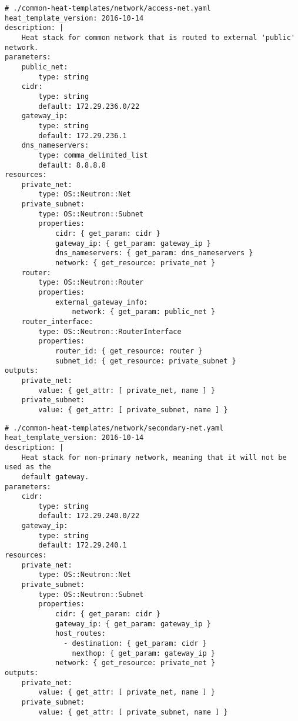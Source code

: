 \begin{verbatim}
# ./common-heat-templates/network/access-net.yaml
heat_template_version: 2016-10-14
description: |
    Heat stack for common network that is routed to external 'public' network.
parameters:
    public_net:
        type: string
    cidr:
        type: string
        default: 172.29.236.0/22
    gateway_ip:
        type: string
        default: 172.29.236.1
    dns_nameservers:
        type: comma_delimited_list
        default: 8.8.8.8
resources:
    private_net:
        type: OS::Neutron::Net
    private_subnet:
        type: OS::Neutron::Subnet
        properties:
            cidr: { get_param: cidr }
            gateway_ip: { get_param: gateway_ip }
            dns_nameservers: { get_param: dns_nameservers }
            network: { get_resource: private_net }
    router:
        type: OS::Neutron::Router
        properties:
            external_gateway_info:
                network: { get_param: public_net }
    router_interface:
        type: OS::Neutron::RouterInterface
        properties:
            router_id: { get_resource: router }
            subnet_id: { get_resource: private_subnet }
outputs:
    private_net:
        value: { get_attr: [ private_net, name ] }
    private_subnet:
        value: { get_attr: [ private_subnet, name ] }
\end{verbatim}

\begin{verbatim}
# ./common-heat-templates/network/secondary-net.yaml
heat_template_version: 2016-10-14
description: |
    Heat stack for non-primary network, meaning that it will not be used as the
    default gateway.
parameters:
    cidr:
        type: string
        default: 172.29.240.0/22
    gateway_ip:
        type: string
        default: 172.29.240.1
resources:
    private_net:
        type: OS::Neutron::Net
    private_subnet:
        type: OS::Neutron::Subnet
        properties:
            cidr: { get_param: cidr }
            gateway_ip: { get_param: gateway_ip }
            host_routes:
              - destination: { get_param: cidr }
                nexthop: { get_param: gateway_ip }
            network: { get_resource: private_net }
outputs:
    private_net:
        value: { get_attr: [ private_net, name ] }
    private_subnet:
        value: { get_attr: [ private_subnet, name ] }
\end{verbatim}


